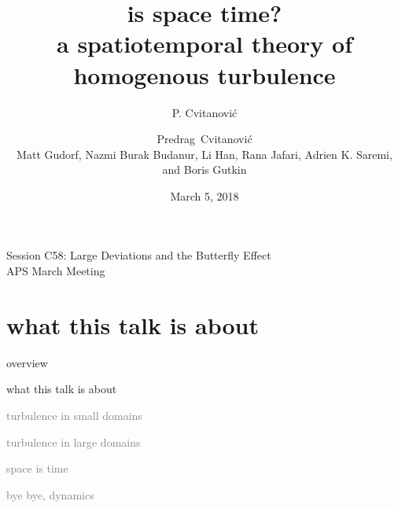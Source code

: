 



\renewcommand{\Ssym}[1]{{\ensuremath{m_{#1}}}}  %
\newcommand{\D}{\mathcal{D}}                    %
\newcommand{\gd}{\mathsf{g}}                    %



\title{
{\huge is space time?}
    \\
{a spatiotemporal theory of homogenous turbulence}
}
\author{P. Cvitanovi\'c}
\author[Cvitanovi\'c]
{
  \textcolor{green!50!black}{
  {Predrag~Cvitanovi\'c \\
  Matt Gudorf,
  Nazmi Burak Budanur,
        Li Han,
        Rana Jafari,
		Adrien K. Saremi,
  and
  Boris Gutkin
  }	%
  }
}
\institute
{
Session C58: Large Deviations and the Butterfly Effect
\\
                APS March Meeting
 }
\date{March 5, 2018}

\begin{frame}
  \titlepage
\end{frame}


\section[what this talk is about]
 {what this talk is about}

\begin{frame}{overview}
\begin{enumerate}
              \item {\Large
what this talk is about
                  }\textcolor{gray}{\small
              \item
turbulence in small domains
              \item
turbulence in large domains
              \item
\catlatt
              \item
space is time
              \item
bye bye, dynamics
                    }
            \end{enumerate}
\end{frame}

